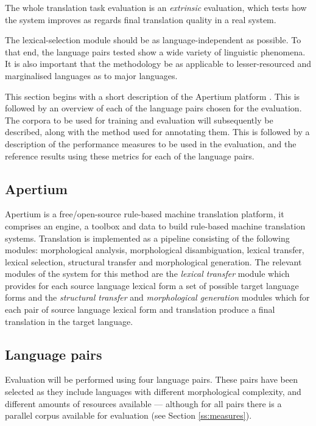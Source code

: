 \documentclass[11pt]{article}
\begin{document}
The
whole translation task evaluation is an \emph{extrinsic} evaluation, which
tests how the system improves as regards final translation
quality in a real system.

The lexical-selection module should be as language-independent as
possible. To that end, the language pairs tested show a wide
variety of linguistic phenomena. It is also important that the
methodology be as applicable to lesser-resourced and marginalised
languages as to major languages.

This section begins with a short description of the Apertium 
platform \citep{forcada2011apertium}. This is followed by 
an overview of each of the language
pairs chosen for the evaluation. The corpora to be used for training
and evaluation will subsequently be described, along with the method
used for annotating them. This is followed by a description of the
performance measures to be used in the evaluation, and the reference
results using these metrics for each of the language pairs.

\subsection{Apertium}
\label{sec:apertium}

Apertium is a free/open-source rule-based machine translation platform, 
it comprises an engine, a toolbox and data to build rule-based machine
translation systems. Translation is implemented as a pipeline consisting
of the following modules: morphological analysis, morphological disambiguation,
lexical transfer, lexical selection, structural transfer and morphological
generation. The relevant modules of the system for this method are the \emph{lexical transfer}
module which provides for each source language lexical form a set of possible
target language forms and the \emph{structural transfer} and \emph{morphological generation}
modules which for each pair of source language lexical form and translation 
produce a final translation in the target language. 

\subsection{Language pairs}
\label{sec:eval-systems}

Evaluation will be performed using four language pairs. These pairs
have been selected as they include languages with different
morphological complexity, and different amounts of resources available
--- although for all pairs there is a parallel corpus available
for evaluation (see Section \ref{ss:measures}). 
\end{document}
